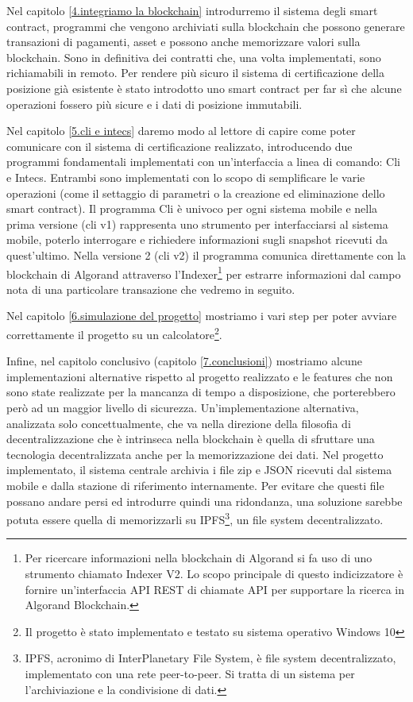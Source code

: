 Nel capitolo \ref{4.integriamo la blockchain} introdurremo il sistema degli smart contract, programmi che vengono archiviati sulla blockchain che possono generare transazioni di pagamenti, asset e possono anche memorizzare valori sulla blockchain. Sono in definitiva dei contratti che, una volta implementati, sono richiamabili in remoto. Per rendere più sicuro il sistema di certificazione della posizione già esistente è stato introdotto uno smart contract per far sì che alcune operazioni fossero più sicure e i dati di posizione immutabili.

Nel capitolo \ref{5.cli e intecs} daremo modo al lettore di capire come poter comunicare con il sistema di certificazione realizzato, introducendo due programmi fondamentali implementati con un'interfaccia a linea di comando: Cli e Intecs. Entrambi sono implementati con lo scopo di semplificare le varie operazioni (come il settaggio di parametri o la creazione ed eliminazione dello smart contract). Il programma Cli è univoco per ogni sistema mobile e nella prima versione (cli v1) rappresenta uno strumento per interfacciarsi al sistema mobile, poterlo interrogare e richiedere informazioni sugli snapshot ricevuti da quest'ultimo. Nella versione 2 (cli v2) il programma comunica direttamente con la blockchain di Algorand attraverso l'Indexer\footnote{Per ricercare informazioni nella blockchain di Algorand si fa uso di uno strumento chiamato Indexer V2. Lo scopo principale di questo indicizzatore è fornire un'interfaccia API REST di chiamate API per supportare la ricerca in Algorand Blockchain.} per estrarre informazioni dal campo nota di una particolare transazione che vedremo in seguito. 

Nel capitolo \ref{6.simulazione del progetto} mostriamo i vari step per poter avviare correttamente il progetto su un calcolatore\footnote{Il progetto è stato implementato e testato su sistema operativo Windows 10}. 

Infine, nel capitolo conclusivo (capitolo \ref{7.conclusioni}) mostriamo alcune implementazioni alternative rispetto al progetto realizzato e le features che non sono state realizzate per la mancanza di tempo a disposizione, che porterebbero però ad un maggior livello di sicurezza. Un'implementazione alternativa, analizzata solo concettualmente, che va nella direzione della filosofia di decentralizzazione che è intrinseca nella blockchain è quella di sfruttare una tecnologia decentralizzata anche per la memorizzazione dei dati. Nel progetto implementato, il sistema centrale archivia i file zip e JSON ricevuti dal sistema mobile e dalla stazione di riferimento internamente. Per evitare che questi file possano andare persi ed introdurre quindi una ridondanza, una soluzione sarebbe potuta essere quella di memorizzarli su IPFS\footnote{IPFS, acronimo di InterPlanetary File System, è file system decentralizzato, implementato con una rete peer-to-peer. Si tratta di un sistema per l'archiviazione e la condivisione di dati.}, un file system decentralizzato.